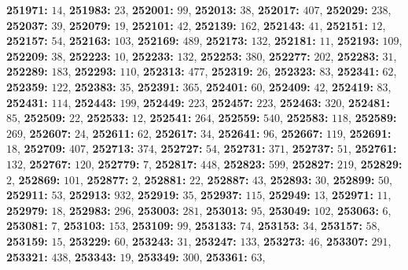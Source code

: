 \textsf{\bfseries 251971:} $14$, \textsf{\bfseries 251983:} $23$, \textsf{\bfseries 252001:} $99$, \textsf{\bfseries 252013:} $38$, \textsf{\bfseries 252017:} $407$, \textsf{\bfseries 252029:} $238$, \textsf{\bfseries 252037:} $39$, \textsf{\bfseries 252079:} $19$, \textsf{\bfseries 252101:} $42$, \textsf{\bfseries 252139:} $162$, \textsf{\bfseries 252143:} $41$, \textsf{\bfseries 252151:} $12$, \textsf{\bfseries 252157:} $54$, \textsf{\bfseries 252163:} $103$, \textsf{\bfseries 252169:} $489$, \textsf{\bfseries 252173:} $132$, \textsf{\bfseries 252181:} $11$, \textsf{\bfseries 252193:} $109$, \textsf{\bfseries 252209:} $38$, \textsf{\bfseries 252223:} $10$, \textsf{\bfseries 252233:} $132$, \textsf{\bfseries 252253:} $380$, \textsf{\bfseries 252277:} $202$, \textsf{\bfseries 252283:} $31$, \textsf{\bfseries 252289:} $183$, \textsf{\bfseries 252293:} $110$, \textsf{\bfseries 252313:} $477$, \textsf{\bfseries 252319:} $26$, \textsf{\bfseries 252323:} $83$, \textsf{\bfseries 252341:} $62$, \textsf{\bfseries 252359:} $122$, \textsf{\bfseries 252383:} $35$, \textsf{\bfseries 252391:} $365$, \textsf{\bfseries 252401:} $60$, \textsf{\bfseries 252409:} $42$, \textsf{\bfseries 252419:} $83$, \textsf{\bfseries 252431:} $114$, \textsf{\bfseries 252443:} $199$, \textsf{\bfseries 252449:} $223$, \textsf{\bfseries 252457:} $223$, \textsf{\bfseries 252463:} $320$, \textsf{\bfseries 252481:} $85$, \textsf{\bfseries 252509:} $22$, \textsf{\bfseries 252533:} $12$, \textsf{\bfseries 252541:} $264$, \textsf{\bfseries 252559:} $540$, \textsf{\bfseries 252583:} $118$, \textsf{\bfseries 252589:} $269$, \textsf{\bfseries 252607:} $24$, \textsf{\bfseries 252611:} $62$, \textsf{\bfseries 252617:} $34$, \textsf{\bfseries 252641:} $96$, \textsf{\bfseries 252667:} $119$, \textsf{\bfseries 252691:} $18$, \textsf{\bfseries 252709:} $407$, \textsf{\bfseries 252713:} $374$, \textsf{\bfseries 252727:} $54$, \textsf{\bfseries 252731:} $371$, \textsf{\bfseries 252737:} $51$, \textsf{\bfseries 252761:} $132$, \textsf{\bfseries 252767:} $120$, \textsf{\bfseries 252779:} $7$, \textsf{\bfseries 252817:} $448$, \textsf{\bfseries 252823:} $599$, \textsf{\bfseries 252827:} $219$, \textsf{\bfseries 252829:} $2$, \textsf{\bfseries 252869:} $101$, \textsf{\bfseries 252877:} $2$, \textsf{\bfseries 252881:} $22$, \textsf{\bfseries 252887:} $43$, \textsf{\bfseries 252893:} $30$, \textsf{\bfseries 252899:} $50$, \textsf{\bfseries 252911:} $53$, \textsf{\bfseries 252913:} $932$, \textsf{\bfseries 252919:} $35$, \textsf{\bfseries 252937:} $115$, \textsf{\bfseries 252949:} $13$, \textsf{\bfseries 252971:} $11$, \textsf{\bfseries 252979:} $18$, \textsf{\bfseries 252983:} $296$, \textsf{\bfseries 253003:} $281$, \textsf{\bfseries 253013:} $95$, \textsf{\bfseries 253049:} $102$, \textsf{\bfseries 253063:} $6$, \textsf{\bfseries 253081:} $7$, \textsf{\bfseries 253103:} $153$, \textsf{\bfseries 253109:} $99$, \textsf{\bfseries 253133:} $74$, \textsf{\bfseries 253153:} $34$, \textsf{\bfseries 253157:} $58$, \textsf{\bfseries 253159:} $15$, \textsf{\bfseries 253229:} $60$, \textsf{\bfseries 253243:} $31$, \textsf{\bfseries 253247:} $133$, \textsf{\bfseries 253273:} $46$, \textsf{\bfseries 253307:} $291$, \textsf{\bfseries 253321:} $438$, \textsf{\bfseries 253343:} $19$, \textsf{\bfseries 253349:} $300$, \textsf{\bfseries 253361:} $63$, 
